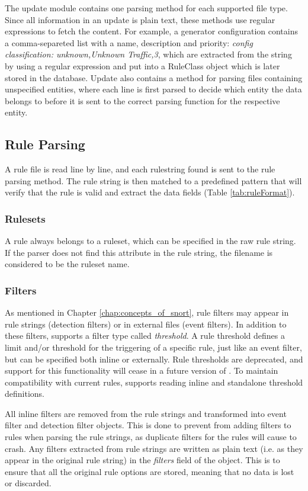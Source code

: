 The update module contains one parsing method for each supported file type.
Since all information in an update is plain text, these methods use regular
expressions to fetch the content. For example, a generator configuration
contains a comma-separeted list with a name, description and priority: {\em
config classification: unknown,Unknown Traffic,3}, which are extracted from the
string by using a regular expression and put into a RuleClass object which is
later stored in the database. Update also contains a method for parsing files
containing unspecified entities, where each line is first parsed to decide which
entity the data belongs to before it is sent to the correct parsing function for
the respective entity.

\subsection{Rule Parsing}
A rule file is read line by line, and each rulestring found is sent to the rule
parsing method. The rule string is then matched to a predefined pattern that
will verify that the rule is valid and extract the data fields (Table
\ref{tab:ruleFormat}).

\subsubsection{Rulesets}
A rule always belongs to a ruleset, which can be specified in the raw
rule string. If the parser does not find this attribute in the rule string,
the filename is considered to be the ruleset name.

\subsubsection{Filters}
As mentioned in Chapter \ref{chap:concepts_of_snort}, rule filters may appear in
rule strings (detection filters) or in external files (event filters). In
addition to these filters, \snowman{} supports a filter type called {\em
threshold}. A rule threshold defines a limit and/or threshold for the triggering
of a specific rule, just like an event filter, but can be specified both inline
or externally. Rule thresholds are deprecated, and support for this
functionality will cease in a future version of \snort{} \cite{SnortManual}. To
maintain compatibility with current rules, \snowman{} supports reading inline
and standalone threshold definitions.

All inline filters are removed from the rule strings and transformed into event
filter and detection filter objects. This is done to prevent \snort{} from
adding filters to rules when parsing the rule strings, as duplicate filters for
the rules will cause \snort{} to crash. Any filters extracted from rule
strings are written as plain text (i.e. as they appear in the original
rule string) in the \textit{filters} field of the 
object. This is to ensure that all the original rule options are stored,
meaning that no data is lost or discarded.

